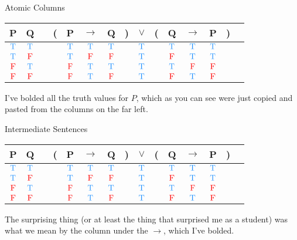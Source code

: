 \documentclass[
  ignorenonframetext,
]{beamer}
\renewcommand{\,}{\text{, }}
\def\True{\textcolor{dodgerblue}{\text{T}}}
\def\False{\textcolor{red}{\text{F}}}
\begin{document}
\begin{frame}{Atomic Columns}
\protect\hypertarget{atomic-columns}{}

\begin{center}
\begin{tabular}{@{ }c@{ }@{ }c | c@{ }@{}c@{}@{ }c@{ }@{ }c@{ }@{ }c@{ }@{}c@{}@{ }c@{ }@{}c@{}@{ }c@{ }@{ }c@{ }@{ }c@{ }@{}c@{}@{ }c}
P & Q &  & ( & P & $\rightarrow$ & Q & ) & $\lor$ & ( & Q & $\rightarrow$ & P & ) & \\
\hline 
$\True$ & $\True$ &  &  & \textbf{$\True$} & $\True$ & $\True$ &  & \textcolor{red}{$\True$} &  & $\True$ & $\True$ & \textbf{$\True$} &  & \\
$\True$ & $\False$ &  &  & \textbf{$\True$} & $\False$ & $\False$ &  & \textcolor{red}{$\True$} &  & $\False$ & $\True$ & \textbf{$\True$} &  & \\
$\False$ & $\True$ &  &  & \textbf{$\False$} & $\True$ & $\True$ &  & \textcolor{red}{$\True$} &  & $\True$ & $\False$ & \textbf{$\False$} &  & \\
$\False$ & $\False$ &  &  & \textbf{$\False$} & $\True$ & $\False$ &  & \textcolor{red}{$\True$} &  & $\False$ & $\True$ & \textbf{$\False$} &  & \\
\end{tabular}
\bigskip
\end{center}

I've bolded all the truth values for \(P\), which as you can see were
just copied and pasted from the columns on the far left.

\end{frame}

\begin{frame}{Intermediate Sentences}
\protect\hypertarget{intermediate-sentences}{}

\begin{center}
\begin{tabular}{@{ }c@{ }@{ }c | c@{ }@{}c@{}@{ }c@{ }@{ }c@{ }@{ }c@{ }@{}c@{}@{ }c@{ }@{}c@{}@{ }c@{ }@{ }c@{ }@{ }c@{ }@{}c@{}@{ }c}
P & Q &  & ( & P & $\rightarrow$ & Q & ) & $\lor$ & ( & Q & $\rightarrow$ & P & ) & \\
\hline 
$\True$ & $\True$ &  &  & $\True$ & \textbf{$\True$} & $\True$ &  & \textcolor{red}{$\True$} &  & $\True$ & $\True$ & $\True$ &  & \\
$\True$ & $\False$ &  &  & $\True$ & \textbf{$\False$} & $\False$ &  & \textcolor{red}{$\True$} &  & $\False$ & $\True$ & $\True$ &  & \\
$\False$ & $\True$ &  &  & $\False$ & \textbf{$\True$} & $\True$ &  & \textcolor{red}{$\True$} &  & $\True$ & $\False$ & $\False$ &  & \\
$\False$ & $\False$ &  &  & $\False$ & \textbf{$\True$} & $\False$ &  & \textcolor{red}{$\True$} &  & $\False$ & $\True$ & $\False$ &  & \\
\end{tabular}
\bigskip
\end{center}

The surprising thing (or at least the thing that surprised me as a
student) was what we mean by the column under the \(\rightarrow\), which
I've bolded.

\end{frame}
\end{document}
